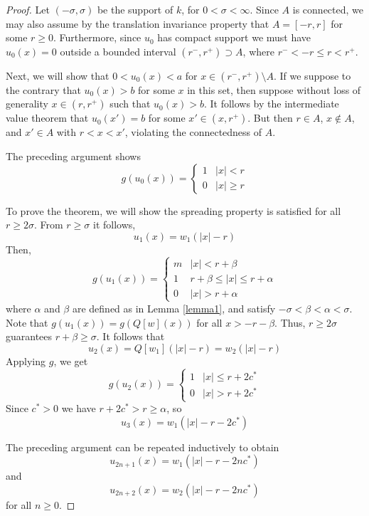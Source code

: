 \documentclass[11pt]{article}
\theoremstyle{definition}
\numberwithin{equation}{section}
\numberwithin{thm}{section}
\begin{document}
\begin{proof}
Let $(-\sigma,\sigma)$ be the support of $k$, for $0<\sigma<\infty$. Since $A$ is connected, we may also assume by the translation invariance property that $A=[-r,r]$ for some $r \geq 0$. Furthermore, since $u_0$ has compact support we must have $u_0(x)=0$ outside a bounded interval $(r^-,r^+) \supset A$, where $r^- < -r \leq r < r^+$.

Next, we will show that $0<u_0(x)<a$ for $x\in(r^-,r^+)\setminus A$. If we suppose to the contrary that $u_0(x)>b$ for some $x$ in this set, then suppose without loss of generality $x\in(r,r^+)$ such that $u_0(x)>b$. It follows by the intermediate value theorem that $u_0(x')=b$ for some $x' \in (x,r^+)$. But then $r\in A$, $x\notin A$, and $x'\in A$ with $r<x<x'$, violating the connectedness of $A$.

The preceding argument shows
\begin{equation}
g(u_0(x)) = \begin{cases}
1 & |x| < r \\
0 & |x| \geq r
\end{cases}
\end{equation}

To prove the theorem, we will show the spreading property is satisfied for all $r\geq2\sigma$. From $r\geq \sigma$ it follows,
\begin{equation}
u_1(x) = w_1(|x|-r)
\end{equation}
Then,
\begin{equation} g(u_1(x)) = \begin{cases}
m & |x|<r+\beta \\
1 & r+\beta\leq |x|\leq r+\alpha \\
0 & |x|>r+\alpha
\end{cases}
\end{equation}
where $\alpha$ and $\beta$ are defined as in Lemma \ref{lemma1}, and satisfy $-\sigma<\beta<\alpha<\sigma$. Note that $g(u_1(x))=g(Q[w](x))$ for all $x>-r-\beta$. Thus, $r\geq 2\sigma$ guarantees $r+\beta\geq\sigma$. It follows that
\begin{equation}
u_2(x) = Q[w_1](|x|-r) = w_2(|x|-r)
\end{equation}
Applying $g$, we get
\begin{equation}
g(u_2(x)) = \begin{cases}
1 & |x| \leq  r+2c^* \\
0 & |x| >  r+2c^*
\end{cases}
\end{equation}
Since $c^*>0$ we have $r+2c^*>r\geq\alpha$, so
\begin{equation}
u_3(x) = w_1(|x|-r-2c^*)
\end{equation}

The preceding argument can be repeated inductively to obtain
\begin{equation}
u_{2n+1}(x) = w_1(|x|-r-2nc^*)
\end{equation}
and
\begin{equation}
u_{2n+2}(x) = w_2(|x|-r-2nc^*)
\end{equation}
for all $n\geq 0$.
\end{proof}
\end{document}
